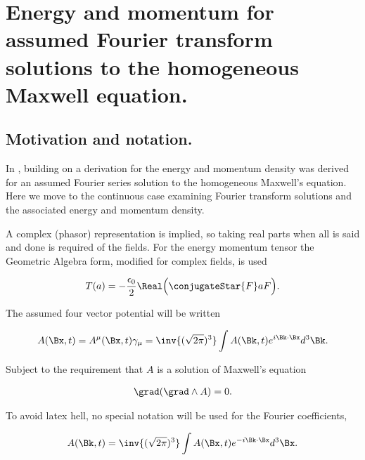

\chapter{Energy and momentum for assumed Fourier transform solutions to the homogeneous Maxwell equation.}
\label{chap:ftMaxVacuum}
\date{Dec 21, 2009}

\beginArtNoToc

\section{Motivation and notation.}

In , building on \cite{complexFieldEnergy} a derivation for the energy and momentum density was derived for an assumed Fourier series solution to the homogeneous Maxwell's equation.  Here we move to the continuous case examining Fourier transform solutions and the associated energy and momentum density.

A complex (phasor) representation is implied, so taking real parts when all is said and done is required of the fields.  For the energy momentum tensor the Geometric Algebra form, modified for complex fields, is used

\begin{align}
\label{eqn:ftMaxVacuum:1}
T(a) = -\frac{\epsilon_0}{2} \Real \Bigl( \conjugateStar{F} a F \Bigr).
\end{align}

The assumed four vector potential will be written

\begin{align}
\label{eqn:ftMaxVacuum:2}
A(\Bx, t) = A^\mu(\Bx, t) \gamma_\mu = \inv{(\sqrt{2 \pi})^3} \int A(\Bk, t) e^{i \Bk \cdot \Bx } d^3 \Bk.
\end{align}

Subject to the requirement that $A$ is a solution of Maxwell's equation

\begin{align}
\label{eqn:ftMaxVacuum:3}
\grad (\grad \wedge A) = 0.
\end{align}

To avoid latex hell, no special notation will be used for the Fourier coefficients,

\begin{align}
\label{eqn:ftMaxVacuum:3a}
A(\Bk, t) = \inv{(\sqrt{2 \pi})^3} \int A(\Bx, t) e^{-i \Bk \cdot \Bx } d^3 \Bx.
\end{align}


